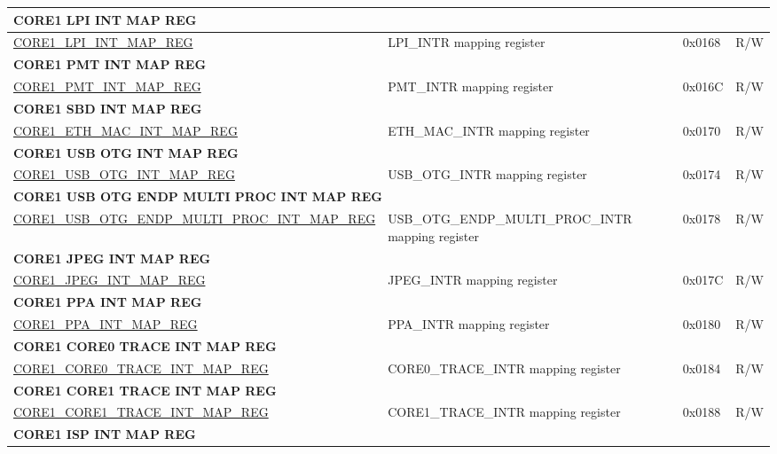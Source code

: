 \begin{longtable}{ | p{7.5cm} | p{7.2cm} | p{1.3cm} | p{1cm} | }
\multicolumn{4}{|l|}{\textbf{CORE1 LPI INT MAP REG}} \\ \hline
\hyperref[regdesc:CORE1LPIINTMAPREG]{CORE1\_LPI\_INT\_MAP\_REG} & LPI\_INTR mapping register & 0x0168 & R/W \\ \hline
\multicolumn{4}{|l|}{\textbf{CORE1 PMT INT MAP REG}} \\ \hline
\hyperref[regdesc:CORE1PMTINTMAPREG]{CORE1\_PMT\_INT\_MAP\_REG} & PMT\_INTR mapping register & 0x016C & R/W \\ \hline
\multicolumn{4}{|l|}{\textbf{CORE1 SBD INT MAP REG}} \\ \hline
\hyperref[regdesc:CORE1SBDINTMAPREG]{CORE1\_ETH\_MAC\_INT\_MAP\_REG} & ETH\_MAC\_INTR mapping register & 0x0170 & R/W \\ \hline
\multicolumn{4}{|l|}{\textbf{CORE1 USB OTG INT MAP REG}} \\ \hline
\hyperref[regdesc:CORE1USBOTGINTMAPREG]{CORE1\_USB\_OTG\_INT\_MAP\_REG} & USB\_OTG\_INTR mapping register & 0x0174 & R/W \\ \hline
\multicolumn{4}{|l|}{\textbf{CORE1 USB OTG ENDP MULTI PROC INT MAP REG}} \\ \hline
\hyperref[regdesc:CORE1USBOTGENDPMULTIPROCINTMAPREG]{CORE1\_USB\_OTG\_ENDP\_MULTI\_PROC\_INT\_MAP\_REG} & USB\_OTG\_ENDP\_MULTI\_PROC\_INTR mapping register & 0x0178 & R/W \\ \hline
\multicolumn{4}{|l|}{\textbf{CORE1 JPEG INT MAP REG}} \\ \hline
\hyperref[regdesc:CORE1JPEGINTMAPREG]{CORE1\_JPEG\_INT\_MAP\_REG} & JPEG\_INTR mapping register & 0x017C & R/W \\ \hline
\multicolumn{4}{|l|}{\textbf{CORE1 PPA INT MAP REG}} \\ \hline
\hyperref[regdesc:CORE1PPAINTMAPREG]{CORE1\_PPA\_INT\_MAP\_REG} & PPA\_INTR mapping register & 0x0180 & R/W \\ \hline
\multicolumn{4}{|l|}{\textbf{CORE1 CORE0 TRACE INT MAP REG}} \\ \hline
\hyperref[regdesc:CORE1CORE0TRACEINTMAPREG]{CORE1\_CORE0\_TRACE\_INT\_MAP\_REG} & CORE0\_TRACE\_INTR mapping register & 0x0184 & R/W \\ \hline
\multicolumn{4}{|l|}{\textbf{CORE1 CORE1 TRACE INT MAP REG}} \\ \hline
\hyperref[regdesc:CORE1CORE1TRACEINTMAPREG]{CORE1\_CORE1\_TRACE\_INT\_MAP\_REG} & CORE1\_TRACE\_INTR mapping register & 0x0188 & R/W \\ \hline
\multicolumn{4}{|l|}{\textbf{CORE1 ISP INT MAP REG}} \\ \hline

\end{longtable}
